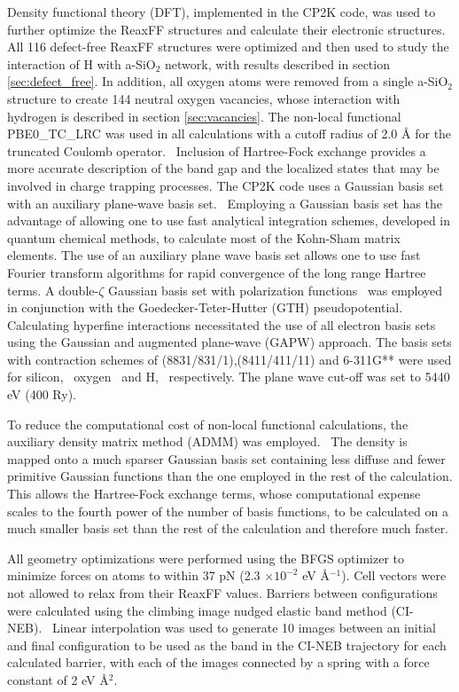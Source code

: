 \documentclass[aps,prb,reprint,superscriptaddress,showpacs]{revtex4-1}
\begin{document}
Density functional theory (DFT), implemented in the CP2K code, was used to further optimize the ReaxFF structures and calculate their electronic structures.~\cite{cp2k_code} All 116 defect-free ReaxFF structures were optimized and then used to study the interaction of H with a-SiO$_2$ network, with results described in section \ref{sec:defect_free}. In addition, all oxygen atoms were removed from a single a-SiO$_2$ structure to create 144 neutral oxygen vacancies, whose interaction with hydrogen is described in section \ref{sec:vacancies}. The non-local functional PBE0\_TC\_LRC was used in all calculations with a cutoff radius of 2.0 {\AA} for the truncated Coulomb operator.~\cite{tc_lrc} Inclusion of Hartree-Fock exchange provides a more accurate description of the band gap and the localized states that may be involved in charge trapping processes. The CP2K code uses a Gaussian basis set with an auxiliary plane-wave basis set.~\cite{cp2k_gpw} Employing a Gaussian basis set has the advantage of allowing one to use fast analytical integration schemes, developed in quantum chemical methods, to calculate most of the Kohn-Sham matrix elements. The use of an auxiliary plane wave basis set allows one to use fast Fourier transform algorithms for rapid convergence of the long range Hartree terms. A double-$\zeta$ Gaussian basis set with polarization functions~\cite{dzv_basis} was employed in conjunction with the Goedecker-Teter-Hutter (GTH) pseudopotential.~\cite{gth_pp} Calculating hyperfine interactions necessitated the use of all electron basis sets using the Gaussian and augmented plane-wave (GAPW) approach. The basis sets with contraction schemes of (8831/831/1),(8411/411/11) and 6-311G** were used for silicon,~\cite{si_basis_crystal} oxygen~\cite{o_basis_crystal} and H,~\cite{li_basis_6311gxx} respectively. The plane wave cut-off was set to 5440 eV (400 Ry).

To reduce the computational cost of non-local functional calculations, the auxiliary density matrix method (ADMM) was employed.~\cite{admm} The density is mapped onto a much sparser Gaussian basis set containing less diffuse and fewer primitive Gaussian functions than the one employed in the rest of the calculation. This allows the Hartree-Fock exchange terms, whose computational expense scales to the fourth power of the number of basis functions, to be calculated on a much smaller basis set than the rest of the calculation and therefore much faster. 

All geometry optimizations were performed using the BFGS optimizer to minimize forces on atoms to within 37 pN (2.3 $\times 10^{-2}$ eV {\AA}$^{-1}$). Cell vectors were not allowed to relax from their ReaxFF values. Barriers between configurations were calculated using the climbing image nudged elastic band method (CI-NEB).~\cite{neb1,neb2} Linear interpolation was used to generate 10 images between an initial and final configuration to be used as the band in the CI-NEB trajectory for each calculated barrier, with each of the images connected by a spring with a force constant of 2 eV {\AA}$^2$.
\end{document}
